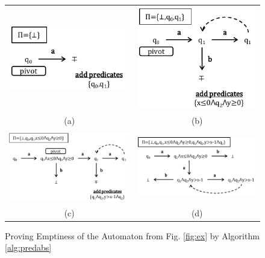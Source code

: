 \documentclass[10pt,conference,letterpaper,twocolumn]{IEEEtran}
\begin{document}
\begin{figure}[t!]
\begin{tabular}{cc}
\includegraphics[scale=0.5]{PA1.pdf} & \includegraphics[scale=0.5]{PA2.pdf} \\[-2mm]
\tiny{(a)} & \tiny{(b)} \\
\\
\includegraphics[scale=0.5]{PA3.pdf} & \includegraphics[scale=0.5]{PA4.pdf} \\[-2mm]
\tiny{(c)} & \tiny{(d)}
\end{tabular}
\vspace*{-\baselineskip}
\caption{Proving Emptiness of the Automaton from Fig. \ref{fig:ex} by Algorithm \ref{alg:predabs}}
\label{fig:pa}
\end{figure}
\end{document}
